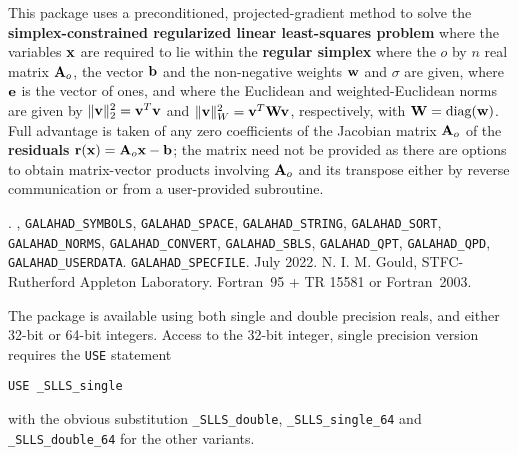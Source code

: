 \documentclass{galahad}
\newcommand{\packagename}{SLLS}
\newcommand{\fullpackagename}{\libraryname\_\packagename}
\begin{document}
\galheader


\galsummary
This package uses a preconditioned, projected-gradient method
to solve the {\bf simplex-constrained regularized linear least-squares problem}
where the variables ${\mathbf{x}}$ are required to lie within the
{\bf regular simplex}
where the $o$ by $n$ real matrix ${\mathbf{A}}_o$, the vector ${\mathbf{b}}$
and the non-negative weights ${\mathbf{w}}$ and $\sigma$ are given, 
where ${\mathbf{e}}$ is the vector of ones, 
and where the Euclidean and weighted-Euclidean norms
are given by $\|{\mathbf{v}}\|_2^2 = {\mathbf{v}}^T {\mathbf{v}}$ and $\|{\mathbf{v}}\|_W^2 = {\mathbf{v}}^T {\mathbf{W}} {\mathbf{v}}$,
respectively, with ${\mathbf{W}} = \mbox{diag}({\mathbf{w}})$.
Full advantage is taken of any zero coefficients of the Jacobian matrix ${\mathbf{A}}_o$
of the {\bf residuals} ${\mathbf{r}}({\mathbf{x}}) = {\mathbf{A}}_o {\mathbf{x}} - {\mathbf{b}}$;
the matrix need not be provided as there are options to obtain matrix-vector
products involving ${\mathbf{A}}_o$ and its transpose either by reverse communication
or from a user-provided subroutine.


\galattributes
\galversions{\tt  \fullpackagename\_single, \fullpackagename\_double}.
,
{\tt GALAHAD\-\_SY\-M\-BOLS},
{\tt GALAHAD\-\_\-SPACE},
{\tt GALAHAD\_STRING},
{\tt GALAHAD\_SORT},
{\tt GALAHAD\_NORMS},
{\tt GALAHAD\_CONVERT},
{\tt GALAHAD\_SBLS},
{\tt GALAHAD\_QPT},
{\tt GALAHAD\_QPD},
{\tt GALAHAD\_USERDATA}.
{\tt GALAHAD\_SPECFILE}.
\galdate July 2022.
\galorigin N. I. M. Gould, STFC-Rutherford Appleton Laboratory.
\gallanguage Fortran~95 + TR 15581 or Fortran~2003.


\galhowto

The package is available using both single and double precision reals, 
and either 32-bit or 64-bit integers. Access to the 32-bit integer,
single precision version requires the {\tt USE} statement
\medskip

\hspace{8mm} {\tt USE \fullpackagename\_single}

\medskip
\noindent
with the obvious substitution {\tt \fullpackagename\_double},
{\tt \fullpackagename\_single\_64} and 
{\tt \fullpackagename\_double\_64} for the other variants.
\end{document}
